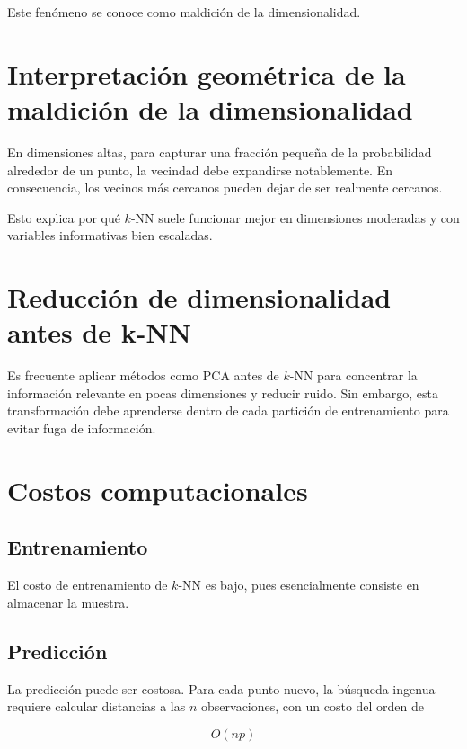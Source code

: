\documentclass[
  spanish,
  11pt,
  letterpaper,
  DIV=11,
  numbers=noendperiod]{scrreprt}
\theoremstyle{definition}
\theoremstyle{plain}
\theoremstyle{definition}
\theoremstyle{remark}
\begin{document}
Este fenómeno se conoce como maldición de la dimensionalidad.

\section{Interpretación geométrica de la maldición de la
dimensionalidad}\label{interpretaciuxf3n-geomuxe9trica-de-la-maldiciuxf3n-de-la-dimensionalidad}

En dimensiones altas, para capturar una fracción pequeña de la
probabilidad alrededor de un punto, la vecindad debe expandirse
notablemente. En consecuencia, los vecinos más cercanos pueden dejar de
ser realmente cercanos.

Esto explica por qué \(k\)-NN suele funcionar mejor en dimensiones
moderadas y con variables informativas bien escaladas.

\section{Reducción de dimensionalidad antes de
k-NN}\label{reducciuxf3n-de-dimensionalidad-antes-de-k-nn}

Es frecuente aplicar métodos como PCA antes de \(k\)-NN para concentrar
la información relevante en pocas dimensiones y reducir ruido. Sin
embargo, esta transformación debe aprenderse dentro de cada partición de
entrenamiento para evitar fuga de información.

\section{Costos computacionales}\label{costos-computacionales}

\subsection{Entrenamiento}\label{entrenamiento-1}

El costo de entrenamiento de \(k\)-NN es bajo, pues esencialmente
consiste en almacenar la muestra.

\subsection{Predicción}\label{predicciuxf3n-1}

La predicción puede ser costosa. Para cada punto nuevo, la búsqueda
ingenua requiere calcular distancias a las \(n\) observaciones, con un
costo del orden de

\[
O(np)
\]
\end{document}
